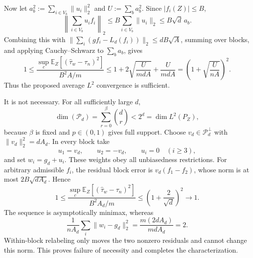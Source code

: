 Now let \(a_b^2:=\sum_{i\in V_b}\|u_i\|_2^2\) and \(U:=\sum_ba_b^2\). Since \(|f_i(Z)|\le B\),
\[
\left\|\sum_{i\in V_b}u_if_i\right\|_2
\le B\sum_{i\in V_b}\|u_i\|_2
\le B\sqrt d\,a_b.
\]
Combining this with \(\|\sum_i(gf_i-L_d(f_i))\|_2\le dB\sqrt A\), summing over blocks, and applying Cauchy--Schwarz to \(\sum_ba_b\), gives
\[
1\le
\frac{\sup_c\mathbb E_Z[(\widehat\tau_w-\tau_n)^2]}{B^2A/m}
\le1+2\sqrt{\frac{U}{mdA}}+\frac{U}{mdA}
=\left(1+\sqrt{\frac{U}{nA}}\right)^2.
\]
Thus the proposed average \(L^2\) convergence is sufficient.

It is not necessary. For all sufficiently large \(d\),
\[
\dim(\mathcal P_d)=\sum_{r=0}^{\beta}\binom dr<2^d=\dim L^2(P_Z),
\]
because \(\beta\) is fixed and \(p\in(0,1)\) gives full support. Choose \(v_d\in\mathcal P_d^\perp\) with \(\|v_d\|_2^2=dA_d\). In every block take
\[
u_1=v_d,\qquad u_2=-v_d,\qquad u_i=0\quad(i\ge3),
\]
and set \(w_i=g_d+u_i\). These weights obey all unbiasedness restrictions. For arbitrary admissible \(f_i\), the residual block error is \(v_d(f_1-f_2)\), whose norm is at most \(2B\sqrt{dA_d}\). Hence
\[
1\le
\frac{\sup_c\mathbb E_Z[(\widehat\tau_w-\tau_n)^2]}{B^2A_d/m}
\le\left(1+\frac{2}{\sqrt d}\right)^2\longrightarrow1.
\]
The sequence is asymptotically minimax, whereas
\[
\frac{1}{nA_d}\sum_i\|w_i-g_d\|_2^2
=\frac{m(2dA_d)}{mdA_d}=2.
\]
Within-block relabeling only moves the two nonzero residuals and cannot change this norm. This proves failure of necessity and completes the characterization.